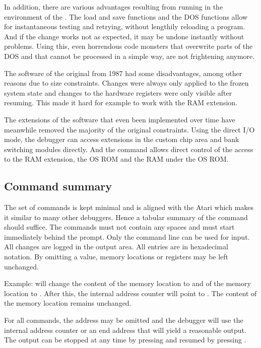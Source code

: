 In addition, there are various advantages resulting from running in the
environment of the \frz. The load and save functions and the DOS functions allow
for instantaneous testing and retrying, without lengthily reloading a program.
And if the change works not as expected, it may be undone instantly without
problems. Using this, even horrendous code monsters that overwrite parts of the
DOS and that cannot be processed in a simple way, are not frightening anymore.

The software of the original \frz from 1987 had some disadvantages, among
other reasons due to size constraints. Changes were always only applied
to the frozen system state and changes to the hardware registers were only
visible after resuming. This made it hard for example to work with the RAM
extension.

The extensions of the software that even been implemented over time have
meanwhile removed the majority of the original constraints. Using the direct I/O
mode, the debugger can access extensions in the custom chip area and bank
switching modules directly. And the  command allows direct control of
the access to the RAM extension, the OS ROM and the RAM under the OS ROM.

\subsection{Command summary}
The set of commands is kept minimal and is aligned with the Atari  which makes it similar to many other debuggers. Hence a
tabular summary of the command should suffice.
The commands must not contain any spaces and must start immediately behind the
prompt. Only the command line can be used for input. All changes are logged in
the output area. All entries are in hexadecimal notation.
By omitting a value, memory locations or registers may be left unchanged.

Example:  will change the content of the memory
location  to  and of the memory location  to
. After this, the internal address counter will point to .
The content of the memory location  remains unchanged.

For all commands, the address may be omitted and the debugger will use the
internal address counter or an end address that will yield a reasonable output.
The output can be stopped at any time by pressing  and resumed by
pressing .

